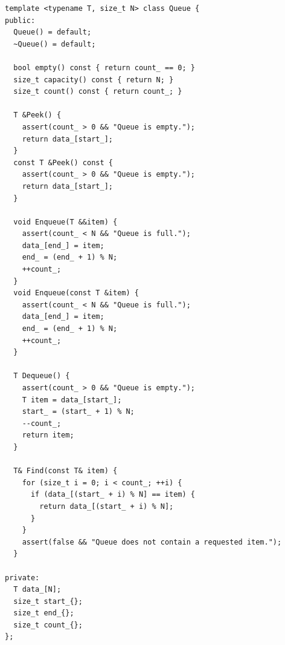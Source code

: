\begin{verbatim}
template <typename T, size_t N> class Queue {
public:
  Queue() = default;
  ~Queue() = default;

  bool empty() const { return count_ == 0; }
  size_t capacity() const { return N; }
  size_t count() const { return count_; }

  T &Peek() {
    assert(count_ > 0 && "Queue is empty.");
    return data_[start_];
  }
  const T &Peek() const {
    assert(count_ > 0 && "Queue is empty.");
    return data_[start_];
  }

  void Enqueue(T &&item) {
    assert(count_ < N && "Queue is full.");
    data_[end_] = item;
    end_ = (end_ + 1) % N;
    ++count_;
  }
  void Enqueue(const T &item) {
    assert(count_ < N && "Queue is full.");
    data_[end_] = item;
    end_ = (end_ + 1) % N;
    ++count_;
  }

  T Dequeue() {
    assert(count_ > 0 && "Queue is empty.");
    T item = data_[start_];
    start_ = (start_ + 1) % N;
    --count_;
    return item;
  }

  T& Find(const T& item) {
    for (size_t i = 0; i < count_; ++i) {
      if (data_[(start_ + i) % N] == item) {
        return data_[(start_ + i) % N];
      }
    }
    assert(false && "Queue does not contain a requested item.");
  }

private:
  T data_[N];
  size_t start_{};
  size_t end_{};
  size_t count_{};
};
\end{verbatim}
